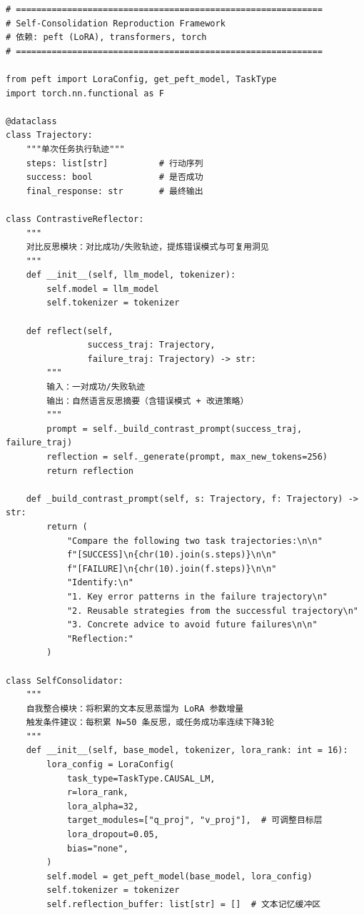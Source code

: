 \documentclass[11pt,a4paper]{article}
\begin{document}
\begin{lstlisting}[style=pythonstyle, caption={Self-Consolidation 核心框架}]
# ============================================================
# Self-Consolidation Reproduction Framework
# 依赖: peft (LoRA), transformers, torch
# ============================================================

from peft import LoraConfig, get_peft_model, TaskType
import torch.nn.functional as F

@dataclass
class Trajectory:
    """单次任务执行轨迹"""
    steps: list[str]          # 行动序列
    success: bool             # 是否成功
    final_response: str       # 最终输出

class ContrastiveReflector:
    """
    对比反思模块：对比成功/失败轨迹，提炼错误模式与可复用洞见
    """
    def __init__(self, llm_model, tokenizer):
        self.model = llm_model
        self.tokenizer = tokenizer

    def reflect(self,
                success_traj: Trajectory,
                failure_traj: Trajectory) -> str:
        """
        输入：一对成功/失败轨迹
        输出：自然语言反思摘要（含错误模式 + 改进策略）
        """
        prompt = self._build_contrast_prompt(success_traj, failure_traj)
        reflection = self._generate(prompt, max_new_tokens=256)
        return reflection

    def _build_contrast_prompt(self, s: Trajectory, f: Trajectory) -> str:
        return (
            "Compare the following two task trajectories:\n\n"
            f"[SUCCESS]\n{chr(10).join(s.steps)}\n\n"
            f"[FAILURE]\n{chr(10).join(f.steps)}\n\n"
            "Identify:\n"
            "1. Key error patterns in the failure trajectory\n"
            "2. Reusable strategies from the successful trajectory\n"
            "3. Concrete advice to avoid future failures\n\n"
            "Reflection:"
        )

class SelfConsolidator:
    """
    自我整合模块：将积累的文本反思蒸馏为 LoRA 参数增量
    触发条件建议：每积累 N=50 条反思，或任务成功率连续下降3轮
    """
    def __init__(self, base_model, tokenizer, lora_rank: int = 16):
        lora_config = LoraConfig(
            task_type=TaskType.CAUSAL_LM,
            r=lora_rank,
            lora_alpha=32,
            target_modules=["q_proj", "v_proj"],  # 可调整目标层
            lora_dropout=0.05,
            bias="none",
        )
        self.model = get_peft_model(base_model, lora_config)
        self.tokenizer = tokenizer
        self.reflection_buffer: list[str] = []  # 文本记忆缓冲区


\end{lstlisting}
\end{document}

